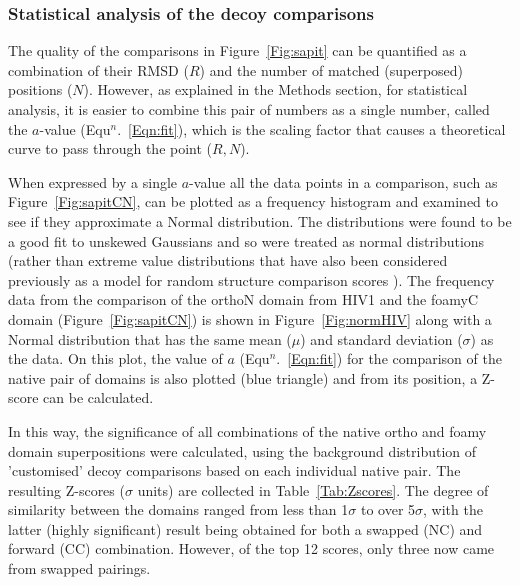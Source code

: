\documentclass{bmcart}
\newcommand{\Tab}[1]{Table~\ref{Tab:#1}}
\newcommand{\Fig}[1]{Figure~\ref{Fig:#1}}
\newcommand{\Eqn}[1]{Equ$^n$.~\ref{Eqn:#1}}
\begin{document}
\subsubsection*{Statistical analysis of the decoy comparisons}

The quality of the comparisons in \Fig{sapit} can be quantified as a combination of their
RMSD ($R$) and the number of matched (superposed) positions ($N$).   However, as explained in
the Methods section, for statistical analysis, it is easier to combine this pair of numbers
as a single number,  called the $a$-value (\Eqn{fit}), which is the scaling factor that
causes a theoretical curve to pass through the point ($R,N$).

When expressed by a single $a$-value
all the data points in a comparison, such as \Fig{sapitCN},
can be plotted as a frequency histogram and examined to see if they approximate a Normal
distribution.   The distributions were found to be a good fit to unskewed Gaussians and
so were treated as normal distributions (rather than extreme value distributions
that have also been considered previously as a model for random structure comparison scores
\cite{LevittMet98,TaylorWR06a}).    The frequency data from the comparison of the orthoN domain from
HIV1 and the foamyC domain (\Fig{sapitCN}) is shown in \Fig{normHIV} along with a Normal
distribution that has the same mean ($\mu$) and standard deviation ($\sigma$) as the data.
On this plot, the value of $a$ (\Eqn{fit}) for the comparison of the
native pair of domains is also plotted (blue triangle) and from its position, a Z-score
can be calculated.

In this way, the significance of all combinations of the native ortho and foamy domain
superpositions were calculated, using the background distribution of 'customised' decoy
comparisons based on each individual native pair.   The resulting Z-scores ($\sigma$ units)
are collected in \Tab{Zscores}.   The degree of similarity between the domains ranged from
less than 1$\sigma$ to over 5$\sigma$, with the latter (highly significant) result being
obtained for both a swapped (NC) and forward (CC) combination.   However, of the top 12
scores, only three now came from swapped pairings.
\end{document}
